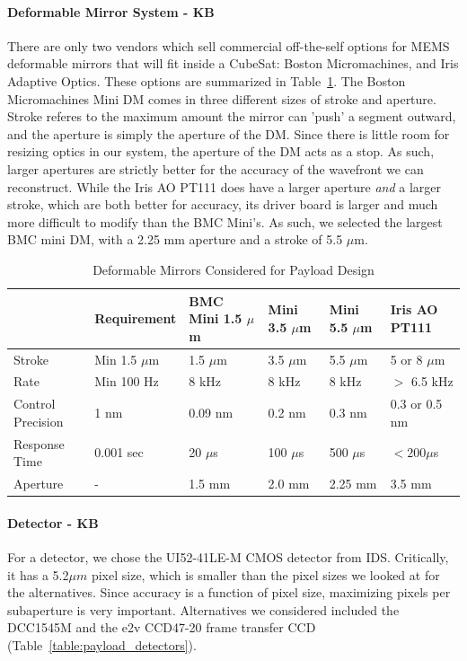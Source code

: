 \documentclass[12pt]{article}
\begin{document}
\paragraph{Deformable Mirror System - KB} \label{par:payload_dms}
There are only two vendors which sell commercial off-the-self options for MEMS deformable mirrors that will fit inside a CubeSat: Boston Micromachines, and Iris Adaptive Optics. These options are summarized in Table~\ref{table:payload_dms}. The Boston Micromachines Mini DM comes in three different sizes of stroke and aperture. Stroke referes to the maximum amount the mirror can 'push' a segment outward, and the aperture is simply the aperture of the DM. Since there is little room for resizing optics in our system, the aperture of the DM
acts as a stop. As such, larger apertures are strictly better for the accuracy of the wavefront we can reconstruct. While the Iris AO PT111 does have a larger aperture \emph{and} a larger stroke, which are both
better for accuracy, its driver board is larger and much more difficult to modify than the BMC Mini's. As such, we selected the largest BMC mini DM, with a 2.25 mm aperture and a stroke of 5.5 $\mu \text{m}$.

\begin{table}[!ht]
  \caption{Deformable Mirrors Considered for Payload Design}
    \begin{tabular}{|l||l|llll|}
      \hline
     &Requirement&BMC Mini 1.5 $\mu$m& Mini 3.5 $\mu$m & Mini 5.5 $\mu$m &Iris AO PT111 \\ \hline
    Stroke& Min 1.5 $\mu$m & 1.5 $\mu$m & 3.5 $\mu$m & 5.5 $\mu$m & 5 or 8 $\mu$m \\ \hline
    Rate& Min 100 Hz& 8 kHz & 8 kHz & 8 kHz & $>$ 6.5 kHz\\ \hline
    Control Precision& 1 nm & 0.09 nm& 0.2 nm & 0.3 nm & 0.3 or 0.5 nm \\ \hline
    Response Time& 0.001 sec & 20 $\mu$s & 100 $\mu$s & 500 $\mu$s& $< 200 \mu$s \\ \hline
    Aperture& - & 1.5 mm & 2.0 mm &2.25 mm&3.5 mm\\
      \hline
    \end{tabular}\label{table:payload_dms}
\end{table}

\paragraph{Detector - KB} \label{par:payload_detector}
For a detector, we chose the UI52-41LE-M CMOS detector from
IDS. Critically, it has a 5.2$\mu m$ pixel size, which is smaller than
the pixel sizes we looked at for the alternatives. Since accuracy is a
function of pixel size, maximizing pixels per subaperture is very
important. Alternatives we considered included the DCC1545M and the
e2v CCD47-20 frame transfer CCD (Table~\ref{table:payload_detectors}). 
\end{document}

